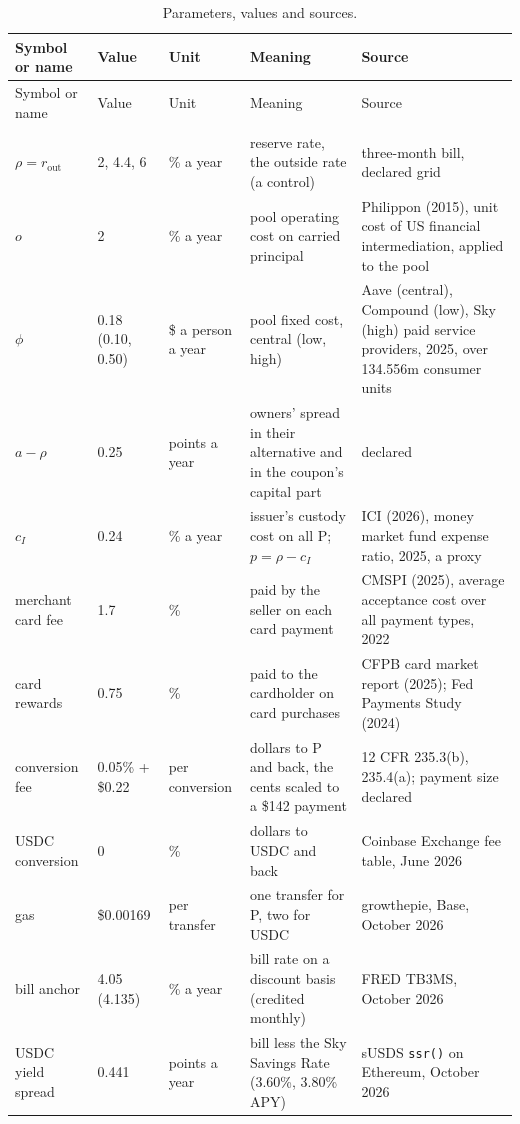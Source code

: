{\small
\setlength{\tabcolsep}{4pt}
\begin{longtable}{@{}p{}p{}p{}p{}p{}@{}}
\caption{Parameters, values and sources.}\label{tab:parameters}\\
\toprule
Symbol or name & Value & Unit & Meaning & Source \\
\midrule
\endfirsthead
\toprule
Symbol or name & Value & Unit & Meaning & Source \\
\midrule
\endhead
\bottomrule
\endfoot
\multicolumn{5}{@{}l}{\textit{Rates and costs}}\\
$\rho = r_{\mathrm{out}}$ & 2, 4.4, 6 & \% a year & reserve rate, the outside rate (a control) & three-month bill, declared grid \\
$o$ & 2 & \% a year & pool operating cost on carried principal & Philippon (2015), unit cost of US financial intermediation, applied to the pool \\
$\phi$ & 0.18 (0.10, 0.50) & \$ a person a year & pool fixed cost, central (low, high) & Aave (central), Compound (low), Sky (high) paid service providers, 2025, over 134.556m consumer units \\
$a - \rho$ & 0.25 & points a year & owners' spread in their alternative and in the coupon's capital part & declared \\
$c_I$ & 0.24 & \% a year & issuer's custody cost on all P; $p = \rho - c_I$ & ICI (2026), money market fund expense ratio, 2025, a proxy \\
merchant card fee & 1.7 & \% & paid by the seller on each card payment & CMSPI (2025), average acceptance cost over all payment types, 2022 \\
card rewards & 0.75 & \% & paid to the cardholder on card purchases & CFPB card market report (2025); Fed Payments Study (2024) \\
conversion fee & 0.05\% + \$0.22 & per conversion & dollars to P and back, the cents scaled to a \$142 payment & 12 CFR 235.3(b), 235.4(a); payment size declared \\
USDC conversion & 0 & \% & dollars to USDC and back & Coinbase Exchange fee table, June 2026 \\
gas & \$0.00169 & per transfer & one transfer for P, two for USDC & growthepie, Base, October 2026 \\
bill anchor & 4.05 (4.135) & \% a year & bill rate on a discount basis (credited monthly) & FRED TB3MS, October 2026 \\
USDC yield spread & 0.441 & points a year & bill less the Sky Savings Rate (3.60\%, 3.80\% APY) & sUSDS \texttt{ssr()} on Ethereum, October 2026 \\

\end{longtable}}
